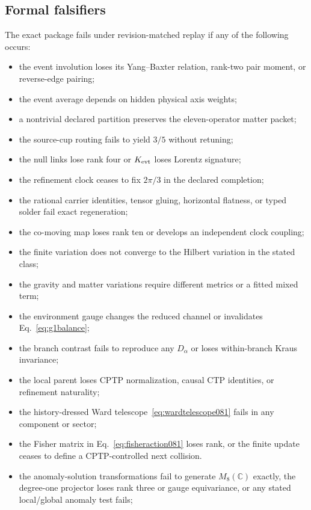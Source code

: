 \documentclass[11pt]{article}
\theoremstyle{definition}
\theoremstyle{remark}
\begin{document}
\subsection{Formal falsifiers}

The exact package fails under revision-matched replay if any of the following occurs:
\begin{itemize}
\item the event involution loses its Yang--Baxter relation, rank-two pair moment, or reverse-edge pairing;
\item the event average depends on hidden physical axis weights;
\item a nontrivial declared partition preserves the eleven-operator matter packet;
\item the source-cup routing fails to yield $3/5$ without retuning;
\item the null links lose rank four or $K_{\rm evt}$ loses Lorentz signature;
\item the refinement clock ceases to fix $2\pi/3$ in the declared completion;
\item the rational carrier identities, tensor gluing, horizontal flatness, or typed solder fail exact regeneration;
\item the co-moving map loses rank ten or develops an independent clock coupling;
\item the finite variation does not converge to the Hilbert variation in the stated class;
\item the gravity and matter variations require different metrics or a fitted mixed term;
\item the environment gauge changes the reduced channel or invalidates Eq.~\eqref{eq:g1balance};
\item the branch contrast fails to reproduce any $D_\alpha$ or loses within-branch Kraus invariance;
\item the local parent loses CPTP normalization, causal CTP identities, or refinement naturality;
\item the history-dressed Ward telescope~\eqref{eq:wardtelescope081} fails in any component or sector;
\item the Fisher matrix in Eq.~\eqref{eq:fisheraction081} loses rank, or the finite update ceases to define a CPTP-controlled next collision.
\item the anomaly-solution transformations fail to generate $M_8(\mathbb C)$ exactly, the degree-one projector loses rank three or gauge equivariance, or any stated local/global anomaly test fails;

\end{itemize}
\end{document}
